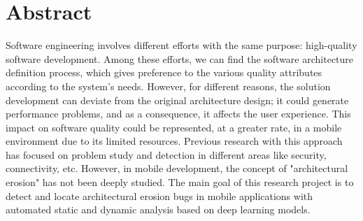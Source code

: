 
\chapter{Abstract}
Software engineering involves different efforts with the same purpose: high-quality software development. Among these efforts, we can find the software architecture definition process, which gives preference to the various quality attributes according to the system's needs. However, for different reasons, the solution development can deviate from the original architecture design; it could generate performance problems, and as a consequence, it affects the user experience. This impact on software quality could be represented, at a greater rate, in a mobile environment due to its limited resources. Previous research with this approach has focused on problem study and detection in different areas like security, connectivity, etc. However, in mobile development, the concept of "architectural erosion" has not been deeply studied. The main goal of this research project is to detect and locate architectural erosion bugs in mobile applications with automated static and dynamic analysis based on deep learning models.
\endinput

